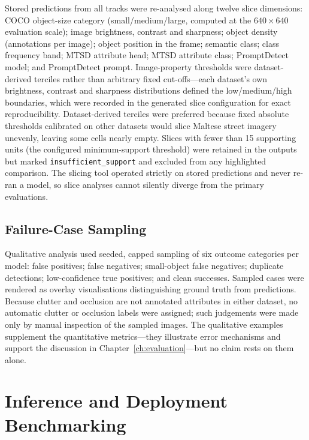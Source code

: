 Stored predictions from all tracks were re-analysed along twelve slice dimensions: COCO object-size category (small/medium/large, computed at the $640 \times 640$ evaluation scale); image brightness, contrast and sharpness; object density (annotations per image); object position in the frame; semantic class; class frequency band; MTSD attribute head; MTSD attribute class; PromptDetect model; and PromptDetect prompt. Image-property thresholds were dataset-derived terciles rather than arbitrary fixed cut-offs---each dataset's own brightness, contrast and sharpness distributions defined the low/medium/high boundaries, which were recorded in the generated slice configuration for exact reproducibility. Dataset-derived terciles were preferred because fixed absolute thresholds calibrated on other datasets would slice Maltese street imagery unevenly, leaving some cells nearly empty. Slices with fewer than 15 supporting units (the configured minimum-support threshold) were retained in the outputs but marked \texttt{insufficient\_support} and excluded from any highlighted comparison. The slicing tool operated strictly on stored predictions and never re-ran a model, so slice analyses cannot silently diverge from the primary evaluations.

\subsection{Failure-Case Sampling}

Qualitative analysis used seeded, capped sampling of six outcome categories per model: false positives; false negatives; small-object false negatives; duplicate detections; low-confidence true positives; and clean successes. Sampled cases were rendered as overlay visualisations distinguishing ground truth from predictions. Because clutter and occlusion are not annotated attributes in either dataset, no automatic clutter or occlusion labels were assigned; such judgements were made only by manual inspection of the sampled images. The qualitative examples supplement the quantitative metrics---they illustrate error mechanisms and support the discussion in Chapter~\ref{ch:evaluation}---but no claim rests on them alone.

\section{Inference and Deployment Benchmarking}
\label{sec:inference-benchmarking}

